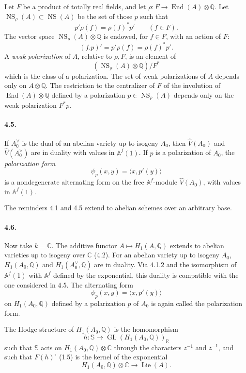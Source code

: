 \documentclass[10pt]{article}
\newcommand{\Af}{\mathbb A^f}
\newcommand{\C}{\mathbb C}
\newcommand{\Q}{\mathbb Q}
\newcommand{\R}{\mathbb R}
\newcommand{\bS}{\mathbb S}
\newcommand{\GL}{\operatorname{GL}}
\newcommand{\Lie}{\operatorname{Lie}}
\newcommand{\End}{\operatorname{End}}
\newcommand{\NS}{\operatorname{NS}}
\begin{document}
Let $F$ be a product of totally real fields, and let $\rho:F\longrightarrow\End(A)\otimes\Q$. Let $\NS_\rho(A)\subset\NS(A)$ be the set of those $p$ such that
\[
p'\rho(f)=\rho(f)^*p'\qquad(f\in F).
\]
The vector space $\NS_\rho(A)\otimes\Q$ is endowed, for $f\in F$, with an action of $F$:
\[
(f.p)'=p'\rho(f)=\rho(f)^*p'.
\]
A \emph{weak polarization} of $A$, relative to $\rho,F$, is an element of
\[
(\NS_\rho(A)\otimes\Q)/F^*
\]
which is the class of a polarization. The set of weak polarizations of $A$ depends only on $A\otimes\Q$. The restriction to the centralizer of $F$ of the involution of $\End(A)\otimes\Q$ defined by a polarization $p\in\NS_\rho(A)$ depends only on the weak polarization $F^*p$.

\paragraph{4.5.} If $A_0^\vee$ is the dual of an abelian variety up to isogeny $A_0$, then $\widehat V(A_0)$ and $\widehat V(A_0^\vee)$ are in duality with values in $\Af(1)$. If $p$ is a polarization of $A_0$, the \emph{polarization form}
\[
\psi_p(x,y)=\langle x,p'(y)\rangle
\]
is a nondegenerate alternating form on the free $\Af$-module $\widehat V(A_0)$, with values in $\Af(1)$.

The reminders 4.1 and 4.5 extend to abelian schemes over an arbitrary base.

\paragraph{4.6.} Now take $k=\C$. The additive functor $A\mapsto H_1(A,\Q)$ extends to abelian varieties up to isogeny over $\C$ (4.2). For an abelian variety up to isogeny $A_0$, $H_1(A_0,\Q)$ and $H_1(A_0^\vee,\Q)$ are in duality. Via 4.1.2 and the isomorphism of $\Af(1)$ with $\Af$ defined by the exponential, this duality is compatible with the one considered in 4.5. The alternating form
\[
\psi_p(x,y)=\langle x,p'(y)\rangle
\]
on $H_1(A_0,\Q)$ defined by a polarization $p$ of $A_0$ is again called the polarization form.

The Hodge structure of $H_1(A_0,\Q)$ is the homomorphism
\[
h:\bS\longrightarrow \GL(H_1(A_0,\Q))_\R
\]
such that $\bS$ acts on $H_1(A_0,\Q)\otimes\C$ through the characters $z^{-1}$ and $\bar z^{-1}$, and such that $F(h)^\circ$ (1.5) is the kernel of the exponential
\[
H_1(A_0,\Q)\otimes\C\longrightarrow\Lie(A).
\]
\end{document}
